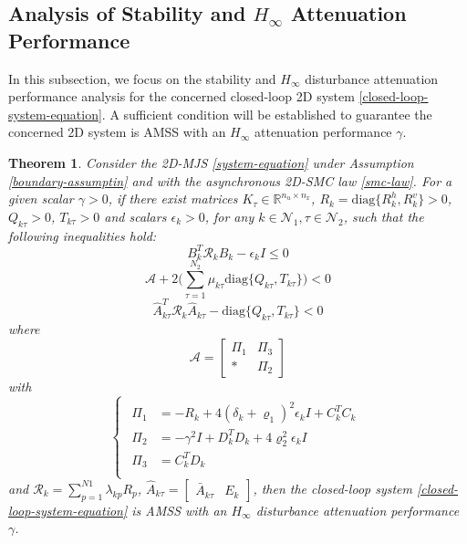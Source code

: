 \documentclass[journal,final,twocolumn]{IEEEtran}
\newtheorem{theorem}{Theorem}
\begin{document}
\subsection{Analysis of Stability and $H_{\infty}$ Attenuation Performance } \label{stability&H_infty}
 In this subsection, we focus on the stability and $H_{\infty}$ disturbance attenuation performance analysis for the concerned closed-loop 2D system \eqref{closed-loop-system-equation}. A sufficient condition will be established to guarantee the concerned 2D system is  AMSS with an $H_{\infty}$ attenuation performance $\gamma$.
\begin{theorem}\label{theorem1}
	Consider the  2D-MJS \eqref{system-equation} under Assumption \eqref{boundary-assumptin} and with the asynchronous 2D-SMC law \eqref{smc-law}. For a given scalar $\gamma>0$, if there exist matrices $K_{\tau }\in\mathbb{R}^{n_u\times n_x}$,  $R_{k}=\mathrm{diag}\{R^{h}_{k},R^{v}_{k}\}>0$,  $Q_{k\tau }>0$, $T_{k\tau }>0$ and scalars $\epsilon_{k}>0$, for any $k\in\mathcal{N}_{1}, \tau\in\mathcal{N}_{2}$,  such that the following inequalities hold: 
	\begin{equation}\label{T1C1}
	B^{T}_{k}  	\mathcal{R}_{k} B_{k} -\epsilon_{k}I \leq 0
	\end{equation}
	\begin{equation}\label{T1C2}
	\mathcal{A} +2\Big(\sum_{\tau =1}^{N_{2}}\mu_{k\tau } \mathrm{diag}\{Q_{k\tau }, T_{k\tau }\}\Big) < 0
	\end{equation}
	\begin{equation}\label{T1C3}
	\hat{A}^{T}_{k\tau }\mathcal{R}_{k}\hat{A}_{k\tau } - \mathrm{diag}\{Q_{k\tau }, T_{k\tau }\} < 0
	\end{equation}
	where
	\begin{equation*}
	\mathcal{A}=\begin{bmatrix}
	\varPi_{1} & \varPi_{3}\\
	*&\varPi_{2}
	\end{bmatrix}
	\end{equation*} with
	\begin{equation*} \label{varPi}
	\left\{
	\begin{array}{lr}
	\begin{split}
	\varPi_{1}&=-R_{k}+4(\delta_{k}+\varrho_{1})^{2}\epsilon_{k}I+C^{T}_{k}C_{k}\\
	\varPi_{2}&=-\gamma^{2}I+D^{T}_{k}D_{k}+4\varrho_{2}^{2}\epsilon_{k}I\\
	\varPi_{3}&= C_{k}^{T}D_{k}\\
	\end{split}
	\end{array}
	\right.
	\end{equation*}
	and $\mathcal{R}_{k}=\sum_{p=1}^{N1}\lambda_{kp}R_{p}$, $\hat{A}_{k\tau }=\begin{bmatrix}
	\bar{A}_{k\tau }& E_{k}
	\end{bmatrix}$, 
	then the closed-loop system \eqref{closed-loop-system-equation} is AMSS with an $H_{\infty}$ disturbance attenuation performance $\gamma$.
\end{theorem}
\end{document}
